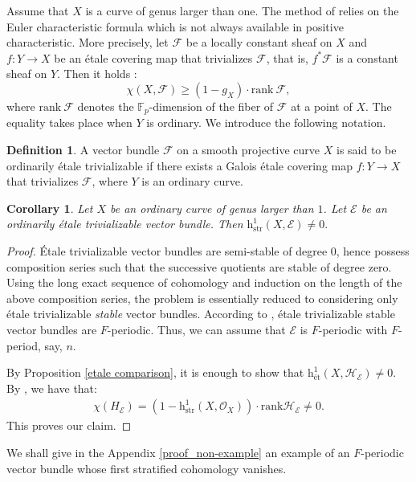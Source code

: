 \documentclass[12pt,a4]{amsart}
\newtheorem{cor}[claim]{Corollary}
\theoremstyle{definition}
\newtheorem{defn}[claim]{Definition}
\begin{document}
Assume that $X$ is a curve of genus larger than one. The method of \cite{BHT25} relies
on the Euler characteristic formula which is not always available in positive characteristic.
More precisely, let $\mathcal F$ be a locally constant sheaf on $X$ and 
$f:Y\longrightarrow X$
be an \'etale covering map that trivializes $\mathcal F$, that is, $f^*\mathcal F$ is
a constant sheaf on $Y$. Then it holds \cite[Theorem~0.2]{Pin00}:
$$\chi(X,\mathcal F)\geq (1-g_X)\cdot \mathrm{rank\ }\mathcal F,$$
where $\mathrm{rank\ }\mathcal F$ denotes the ${\mathbb F}_{p}$-dimension 
of the fiber of $\mathcal F$ at a point of $X$.  
The equality takes place when $Y$ is ordinary. We introduce the following notation.
\begin{defn}
A vector bundle $\mathcal{F}$ on a smooth projective curve
$X$ is said to be ordinarily \'etale trivializable if there 
exists a Galois \'etale covering map $f:Y\longrightarrow X$
that trivializes $\mathcal F$, where $Y$ is an ordinary curve.
\end{defn}

 
\begin{cor}\label{cor_non-vanishing}
Let $X$ be an ordinary curve of genus larger than $1$. 
Let $\mathcal E$ be an ordinarily \'etale trivializable vector bundle. 
Then $\mathrm h^1_\mathrm{str}(X, \mathcal E) \neq 0.$
\end{cor}
\begin{proof}
\'Etale trivializable vector bundles are semi-stable of degree 0, hence possess
composition series  such that the successive quotients are 
stable of degree zero.
Using the long exact sequence of cohomology and induction on the length
of the above composition series, the problem is essentially reduced
to considering only \'etale trivializable \textit{stable} vector bundles.
According to  \cite{BD07}, \'etale trivializable stable vector bundles are $F$-periodic.
Thus, we can assume that $\mathcal E$ is $F$-periodic with $F$-period, say, $n$.

By Proposition \ref{etale comparison}, it is enough to show that 
$\mathrm h^1_\text{\'et}(X,\mathcal H_{\mathcal E})\neq 0$.  By \cite[Theorem~0.2]{Pin00}, we have that:
\begin{align*}
\chi(H_\mathcal{E})= (1-\mathrm h^1_\mathrm{str}(X,\mathcal{O}_X))\cdot \mathrm{rank}
\mathcal H_{\mathcal E}\neq 0.
\end{align*} This proves our claim.
\end{proof}

We shall give in the Appendix \ref{proof_non-example} an
example of an $F$-periodic vector bundle whose first stratified cohomology vanishes. 
\end{document}
